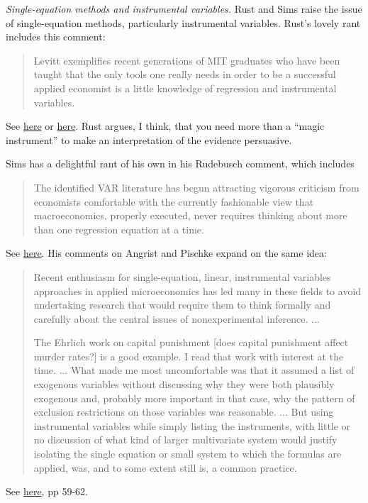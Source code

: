 \documentclass[11pt,letterpaper]{article}
\begin{document}
{\it Single-equation methods and instrumental variables.\/}
Rust and Sims raise the issue of single-equation methods, particularly
instrumental variables.
Rust's lovely rant includes this comment:
%
\begin{quote}
Levitt exemplifies recent generations of MIT graduates
who have been taught that the only tools one really needs in order to be a successful
applied economist is a little knowledge of regression and instrumental variables.
\end{quote}
See
\href{http://gemini.econ.umd.edu/jrust/research/keane_comments.pdf}{here}
or
\href{http://www.sciencedirect.com/science/article/pii/S030440760900195X}{here}.
Rust argues, I think, that you need more than a ``magic instrument''
to make an interpretation of the evidence persuasive.

Sims has a delightful rant of his own in his Rudebusch comment,
which includes
%
\begin{quote}
The identified VAR literature has begun attracting
vigorous criticism from economists comfortable with the currently fashionable view that macroeconomics, properly executed, never requires thinking about
more than one regression equation at a time.
\end{quote}
See
\href{http://pages.stern.nyu.edu/~dbackus/Identification/Sims_on_Rudebusch_IER_98.pdf}{here}.
His comments on Angrist and Pischke expand on the same idea:
\begin{quote}
Recent enthusiasm for single-equation, linear, instrumental variables
approaches in applied microeconomics has led many in these fields to avoid
undertaking research that would require them to think formally and carefully about
the central issues of nonexperimental inference. ...

The Ehrlich work on capital punishment [does capital punishment affect murder rates?]
is a good example.
I read that work with interest at the time. ...
What made me most uncomfortable was that it assumed a list of
exogenous variables without discussing why they were both plausibly
exogenous and, probably more important in that case, why the pattern of exclusion
restrictions on those variables was reasonable. ...
But using instrumental variables while simply listing the
instruments, with little or no discussion of what kind of larger multivariate system
would justify isolating the single equation or small system to which the formulas
are applied, was, and to some extent still is, a common practice. %
%
\end{quote}
See
\href{http://isc.temple.edu/economics/Econ8190/Readings/jep.24.2.59.pdf}{here}, pp 59-62.
\end{document}
